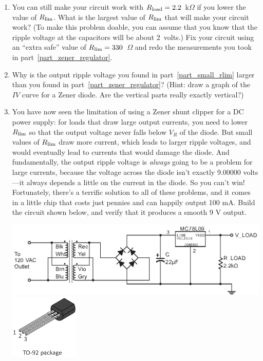 \begin{enumerate}[wide]
\item You can still make your circuit work with $R_{\rm load} = 2.2$~k$\Omega$ if you lower the value of $R_{\rm lim}$.  What is the largest value of $R_{\rm lim}$ that will make your circuit work?  (To make this problem doable, you can assume that you know that the ripple voltage at the capacitors will be about 2~volts.)  Fix your circuit using an ``extra safe'' value of $R_{\rm lim}=330$~$\Omega$ and redo the measurements you took in part~\ref{part_zener_regulator}.  \label{part_small_rlim}

\item Why is the output ripple voltage you found in part~\ref{part_small_rlim} larger than you found in part~\ref{part_zener_regulator}?  (Hint: draw a graph of the $IV$ curve for a Zener diode.  Are the vertical parts really exactly vertical?)

\item You have now seen the limitation of using a Zener shunt clipper for a DC power supply: for loads that draw large output currents, you need to lower $R_{\rm lim}$ so that the output voltage never falls below $V_R$ of the diode.  But small values of $R_{\rm lim}$ draw more current, which leads to larger ripple voltages, and would eventually lead to currents that would damage the diode.  And fundamentally, the output ripple voltage is \textit{always} going to be a problem for large currents, because the voltage across the diode isn't exactly 9.00000 volts---it always depends a little on the current in the diode.  So you can't win!  Fortunately, there's a terrific solution to all of these problems, and it comes in a little chip that costs just pennies and can happily output 100 mA.  Build the circuit shown below, and verify that it produces a smooth 9 V output. \label{part_linear_power_supply_78xx}
\begin{center}
\includegraphics{power_supply/7809_regulator.eps}
\includegraphics[width=1.3in]{appendices/pinouts/TO-92_package_pinout.eps}
\end{center}
 

\end{enumerate}
